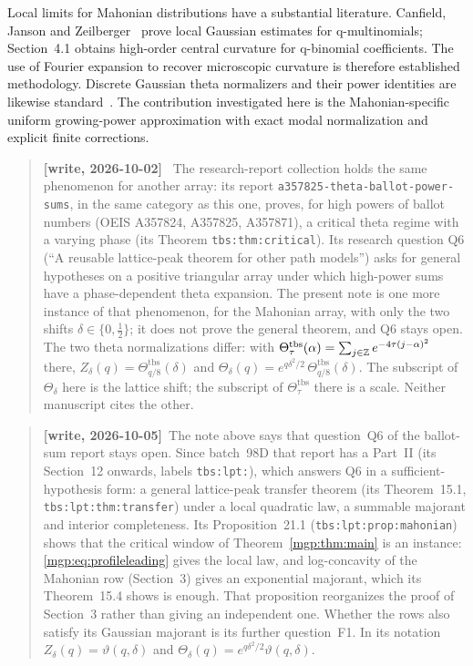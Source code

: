 \documentclass[11pt]{article}
\newenvironment{writenote}{\begin{quote}\small\sloppy\textbf{[write, 2026-10-02]}\ }{\end{quote}}
\begin{document}
Local limits for Mahonian distributions have a substantial literature. Canfield, Janson and Zeilberger~\cite{cjz} prove local Gaussian estimates for q-multinomials; Section~4.1 obtains high-order central curvature for q-binomial coefficients. The use of Fourier expansion to recover microscopic curvature is therefore established methodology. Discrete Gaussian theta normalizers and their power identities are likewise standard~\cite{agostini,nielsen}. The contribution investigated here is the Mahonian-specific uniform growing-power approximation with exact modal normalization and explicit finite corrections.

\begin{writenote}
The research-report collection holds the same phenomenon for another array: its report
\texttt{a357825-theta-ballot-power-sums}, in the same category as this one, proves, for high powers of ballot numbers (OEIS A357824, A357825, A357871), a critical theta regime
with a varying phase (its Theorem \texttt{tbs:thm:critical}). Its research question Q6 (``A reusable
lattice-peak theorem for other path models'') asks for general hypotheses on a positive triangular
array under which high-power sums have a phase-dependent theta expansion. The present note is one
more instance of that phenomenon, for the Mahonian array, with only the two shifts
$\delta\in\{0,\tfrac12\}$; it does not prove the general theorem, and Q6 stays open. The two theta
normalizations differ: with $\Theta^{\mathrm{tbs}}_\tau(\alpha)=\sum_{j\in\mathbb Z}e^{-4\tau(j-\alpha)^2}$
there, $Z_\delta(q)=\Theta^{\mathrm{tbs}}_{q/8}(\delta)$ and
$\Theta_\delta(q)=e^{q\delta^2/2}\,\Theta^{\mathrm{tbs}}_{q/8}(\delta)$. The subscript of
$\Theta_\delta$ here is the lattice shift; the subscript of $\Theta^{\mathrm{tbs}}_\tau$ there is a
scale. Neither manuscript cites the other.
\end{writenote}

\begin{quote}\small\sloppy\textbf{[write, 2026-10-05]}\ The note above says
that question~Q6 of the ballot-sum report stays open. Since batch~98D that
report has a Part~II (its Section~12 onwards, labels \texttt{tbs:lpt:}),
which answers Q6 in a sufficient-hypothesis form: a general lattice-peak
transfer theorem (its Theorem~15.1, \texttt{tbs:lpt:thm:transfer}) under a
local quadratic law, a summable majorant and interior completeness. Its
Proposition~21.1 (\texttt{tbs:lpt:prop:mahonian}) shows that the critical
window of Theorem~\ref{mgp:thm:main} is an instance: \eqref{mgp:eq:profileleading}
gives the local law, and log-concavity of the Mahonian row (Section~3)
gives an exponential majorant, which its Theorem~15.4 shows is enough. That
proposition reorganizes the proof of Section~3 rather than giving an
independent one. Whether the rows also satisfy its Gaussian majorant is its
further question~F1. In its notation $Z_\delta(q)=\vartheta(q,\delta)$ and
$\Theta_\delta(q)=e^{q\delta^2/2}\vartheta(q,\delta)$.
\end{quote}
\end{document}
